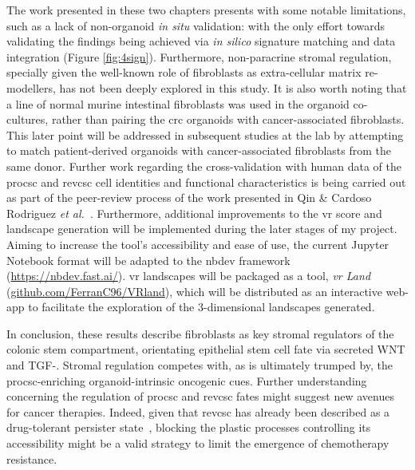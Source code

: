 The work presented in these two chapters presents with some notable limitations, such as a lack of non-organoid \emph{in situ} validation: with the only effort towards validating the findings being achieved via \emph{in silico} signature matching and data integration (Figure \ref{fig:4sign}). Furthermore, non-paracrine stromal regulation, specially given the well-known role of fibroblasts as extra-cellular matrix re-modellers, has not been deeply explored in this study. It is also worth noting that a line of normal murine intestinal fibroblasts was used in the organoid co-cultures, rather than pairing the \acrshort{crc} organoids with cancer-associated fibroblasts. 
This later point will be addressed in subsequent studies at the lab by attempting to match patient-derived organoids with cancer-associated fibroblasts from the same donor. Further work regarding the cross-validation with human data of the \acrshort{procsc} and \acrshort{revcsc} cell identities and functional characteristics is being carried out as part of the peer-review process of the work presented in Qin \& Cardoso Rodriguez \emph{et al.}~\cite{cardoso_rodriguez_single-cell_2023}. Furthermore, additional improvements to the \acrshort{vr} score and landscape generation will be implemented during the later stages of my project. Aiming to increase the tool's accessibility and ease of use, the current Jupyter Notebook format will be adapted to the nbdev framework (\url{https://nbdev.fast.ai/}). \acrshort{vr} landscapes will be packaged as a tool, \emph{\acrshort{vr} Land} (\url{github.com/FerranC96/VRland}), which will be distributed as an interactive web-app to facilitate the exploration of the 3-dimensional landscapes generated.

In conclusion, these results describe fibroblasts as key stromal regulators of the colonic stem compartment, orientating epithelial stem cell fate via secreted WNT and TGF-\textbeta\hspace{0.1cm}. Stromal regulation competes with, as is ultimately trumped by, the \acrshort{procsc}-enriching organoid-intrinsic oncogenic cues. Further understanding concerning the regulation of \acrshort{procsc} and \acrshort{revcsc} fates might suggest new avenues for cancer therapies. Indeed, given that \acrshort{revcsc} has already been described as a drug-tolerant persister state~\cite{alvarez-varela_mex3a_2022}, blocking the plastic processes controlling its accessibility might be a valid strategy to limit the emergence of chemotherapy resistance. 


